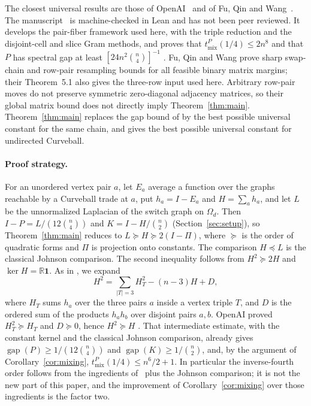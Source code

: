 The closest universal results are those of OpenAI~\cite{OAI26} and of Fu, Qin
and Wang~\cite{FQW26}. The manuscript~\cite{OAI26} is machine-checked in Lean
and has not been peer reviewed. It develops the pair-fiber framework used
here, with the triple reduction and the disjoint-cell and slice Gram methods,
and proves that $t_{\mathrm{mix}}^P(1/4)\le2n^8$ and that $P$ has spectral gap
at least $[24n^2\binom n4]^{-1}$ \cite[Theorem~1.1]{OAI26}. Fu, Qin and Wang prove sharp swap-chain and
row-pair resampling bounds for all feasible binary matrix margins; their
Theorem~5.1 also gives the three-row input used here. Arbitrary row-pair moves
do not preserve symmetric zero-diagonal adjacency matrices, so their global
matrix bound does not directly imply Theorem~\ref{thm:main}.
Theorem~\ref{thm:main} replaces the gap bound of \cite[Theorem~1.1]{OAI26} by
the best possible universal constant for the same chain, and gives the best
possible universal constant for undirected Curveball.

\paragraph{Proof strategy.}
For an unordered vertex pair $a$, let $E_a$ average a function over the
graphs reachable by a Curveball trade at $a$, put $h_a=I-E_a$ and $H=\sum_ah_a$, and let $L$ be the unnormalized
Laplacian of the switch graph on $\Omega_d$. Then $I-P=L/(12\binom n4)$ and
$K=I-H/\binom n2$ (Section~\ref{sec:setup}), so Theorem~\ref{thm:main} reduces
to $L\succeq H\succeq2(I-\Pi)$, where $\succeq$ is the order of quadratic
forms and $\Pi$ is projection onto constants. The comparison $H\preceq L$ is
the classical Johnson comparison. The second inequality follows from
$H^2\succeq2H$ and $\ker H=\mathbb R\mathbf 1$. As in
\cite[Proposition~7.1]{OAI26}, we expand
\[
 H^2=\sum_{|T|=3}H_T^2-(n-3)H+D,
\]
where $H_T$ sums $h_a$ over the three pairs $a$ inside a vertex triple $T$,
and $D$ is the
ordered sum of the products $h_ah_b$ over disjoint pairs $a,b$. OpenAI
proved $H_T^2\succeq H_T$ and $D\succeq0$, hence $H^2\succeq H$
\cite[Propositions~4.1 and~7.1, Corollary~6.3]{OAI26}. That intermediate
estimate, with the constant kernel and the classical Johnson comparison,
already gives $\operatorname{gap}(P)\ge1/(12\binom n4)$ and
$\operatorname{gap}(K)\ge1/\binom n2$, and, by the argument of
Corollary~\ref{cor:mixing}, $t_{\mathrm{mix}}^P(1/4)\le n^6/2+1$. In
particular the inverse-fourth order follows from the ingredients
of~\cite{OAI26} plus the Johnson comparison; it is not the new part of this
paper, and the improvement of Corollary~\ref{cor:mixing} over those
ingredients is the factor two.


